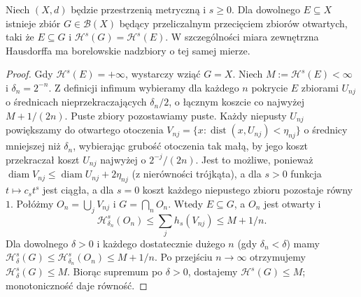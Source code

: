 \begin{twierdzenie}
\label{thm:hausdorff-gdelta-26}
Niech $(X,d)$ będzie przestrzenią metryczną i $s\ge0$.
Dla dowolnego $E\subseteq X$ istnieje zbiór
$G\in\mathcal B(X)$ będący przeliczalnym
przecięciem zbiorów otwartych, taki że
$E\subseteq G$ i $\mathcal H^s(G)=\mathcal H^s(E)$.
W szczególności miara zewnętrzna Hausdorffa ma
borelowskie nadzbiory o tej samej mierze.
\end{twierdzenie}
\begin{proof}
Gdy $\mathcal H^s(E)=+\infty$, wystarczy wziąć $G=X$.
Niech $M:=\mathcal H^s(E)<\infty$ i $\delta_n=2^{-n}$.
Z definicji infimum wybieramy dla każdego $n$
pokrycie $E$ zbiorami $U_{nj}$ o średnicach
nieprzekraczających $\delta_n/2$, o łącznym
koszcie co najwyżej $M+1/(2n)$.
Puste zbiory pozostawiamy puste. Każdy niepusty
$U_{nj}$ powiększamy do otwartego otoczenia
$V_{nj}=\{x:\operatorname{dist}(x,U_{nj})<\eta_{nj}\}$
o średnicy
mniejszej niż $\delta_n$, wybierając grubość
otoczenia tak małą, by jego koszt przekraczał
koszt $U_{nj}$ najwyżej o $2^{-j}/(2n)$.
Jest to możliwe, ponieważ
$\operatorname{diam}V_{nj}\le\operatorname{diam}U_{nj}+2\eta_{nj}$
(z nierówności trójkąta), a dla $s>0$ funkcja
$t\mapsto c_st^s$ jest ciągła, a dla $s=0$
koszt każdego niepustego zbioru pozostaje równy $1$.
Połóżmy $O_n=\bigcup_jV_{nj}$ i $G=\bigcap_nO_n$.
Wtedy $E\subseteq G$, a $O_n$ jest otwarty i
\[
 \mathcal H^s_{\delta_n}(O_n)
 \leq\sum_jh_s(V_{nj})\leq M+1/n.
\]
Dla dowolnego $\delta>0$ i każdego dostatecznie
dużego $n$ (gdy $\delta_n<\delta$) mamy
$\mathcal H^s_\delta(G)\leq
\mathcal H^s_{\delta_n}(O_n)\leq M+1/n$.
Po przejściu $n\to\infty$ otrzymujemy
$\mathcal H^s_\delta(G)\leq M$.
Biorąc supremum po $\delta>0$,
dostajemy $\mathcal H^s(G)\leq M$;
monotoniczność daje równość.
\end{proof}


